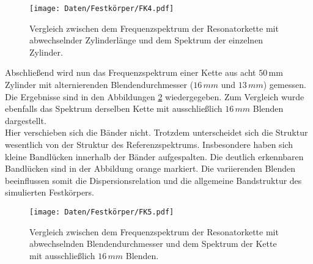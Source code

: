 \begin{figure}[H]
  \centering
  \texttt{[image: Daten/Festkörper/FK4.pdf]} 
  \caption{Vergleich zwischen dem Frequenzspektrum der Resonatorkette mit abwechselnder Zylinderlänge und dem Spektrum der einzelnen Zylinder.} 
  \label{fig:fkMod2}
\end{figure}
Abschließend wird nun das Frequenzspektrum einer Kette aus acht $50\,\si{\milli\metre}$ Zylinder mit alternierenden Blendendurchmesser ($16\, mm$ und $13\, mm$) gemessen. Die Ergebnisse sind in den Abbildungen \ref{fig:fkMod3} wiedergegeben. Zum Vergleich wurde ebenfalls das Spektrum derselben Kette mit ausschließlich $16\, mm$ Blenden dargestellt. \\
Hier verschieben sich die Bänder nicht. Trotzdem unterscheidet sich die Struktur wesentlich von der Struktur des Referenzspektrums. Insbesondere haben sich kleine Bandlücken innerhalb der Bänder aufgespalten. Die deutlich erkennbaren Bandlücken sind in der Abbildung orange markiert. 
Die variierenden Blenden beeinflussen somit die Dispersionsrelation und die allgemeine Bandstruktur des simulierten Festkörpers. 

\begin{figure}[H]
  \centering
  \texttt{[image: Daten/Festkörper/FK5.pdf]} 
  \caption{Vergleich zwischen dem Frequenzspektrum der Resonatorkette mit abwechselnden Blendendurchmesser und dem Spektrum der Kette mit ausschließlich $16\, mm$ Blenden.} 
  \label{fig:fkMod3}
\end{figure}